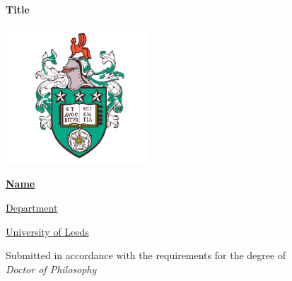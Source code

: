 \begin{titlepage}
	\begin{center}
		\vspace*{1cm}
		
		\textbf{\Large Title}
		
		\vspace{2cm}
		
		\includegraphics[width=0.4\textwidth]{Figures/Titlepage/Leeds_Crest}
		\label{title:crest}
		
		\vspace{2cm}
		
		\textbf{\href{mailto: email@leeds.ac.uk}{\Large Name}}
		
		\vspace{1ex}
		
		\href{Link to department page}{\large Department}
		
		\vspace{1ex}
		
		\href{http://www.leeds.ac.uk/}{\large University of Leeds}
		
		\vfill
		
		Submitted in accordance with the requirements for the degree of \\
		\textit{Doctor of Philosophy}
		
		\vspace{0.8cm}
		
		\printdate
		
	\end{center}
\end{titlepage}